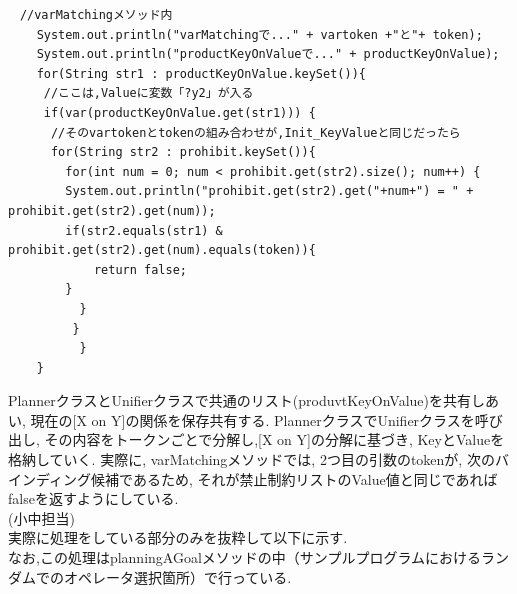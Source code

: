 \documentclass[uplatex,12pt]{jsarticle}
\begin{document}
\begin{lstlisting}[caption=禁止制約をHashMapに管理, label=src:No1]
　//varMatchingメソッド内
	System.out.println("varMatchingで..." + vartoken +"と"+ token);
	System.out.println("productKeyOnValueで..." + productKeyOnValue);
	for(String str1 : productKeyOnValue.keySet()){
	 //ここは,Valueに変数「?y2」が入る
	 if(var(productKeyOnValue.get(str1))) {
	  //そのvartokenとtokenの組み合わせが,Init_KeyValueと同じだったら
	  for(String str2 : prohibit.keySet()){
	    for(int num = 0; num < prohibit.get(str2).size(); num++) {
		System.out.println("prohibit.get(str2).get("+num+") = " + prohibit.get(str2).get(num));
		if(str2.equals(str1) & prohibit.get(str2).get(num).equals(token)){
			return false;
		}
	      }
	     }
          }
	}
\end{lstlisting}
PlannerクラスとUnifierクラスで共通のリスト(produvtKeyOnValue)を共有しあい, 現在の[X on Y]の関係を保存共有する. PlannerクラスでUnifierクラスを呼び出し, その内容をトークンごとで分解し,[X on Y]の分解に基づき, KeyとValueを格納していく.
実際に, varMatchingメソッドでは, 2つ目の引数のtokenが, 次のバインディング候補であるため, それが禁止制約リストのValue値と同じであればfalseを返すようにしている. \\

\noindent (小中担当) \\
実際に処理をしている部分のみを抜粋して以下に示す.\\
なお,この処理はplanningAGoalメソッドの中（サンプルプログラムにおけるランダムでのオペレータ選択箇所）で行っている.
\end{document}

